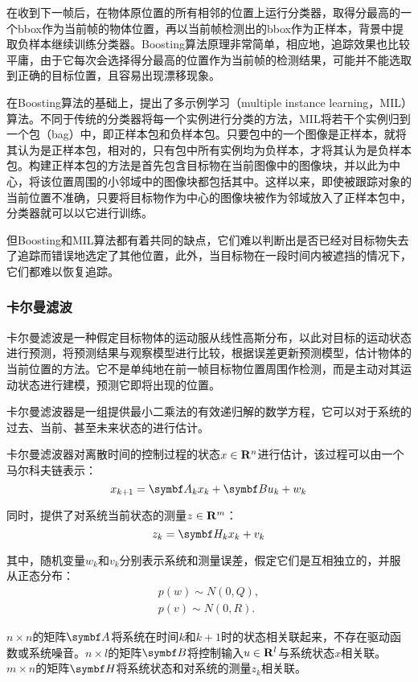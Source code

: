   在收到下一帧后，在物体原位置的所有相邻的位置上运行分类器，取得分最高的一个bbox作为当前帧的物体位置，再以当前帧检测出的bbox作为正样本，背景中提取负样本继续训练分类器。Boosting算法原理非常简单，相应地，追踪效果也比较平庸，由于它每次会选择得分最高的位置作为当前帧的检测结果，可能并不能选取到正确的目标位置，且容易出现漂移现象。

  在Boosting算法的基础上，\citet{babenko2009visual}提出了多示例学习（multiple instance learning，MIL）算法。不同于传统的分类器将每一个实例进行分类的方法，MIL将若干个实例归到一个包（bag）中，即正样本包和负样本包。只要包中的一个图像是正样本，就将其认为是正样本包，相对的，只有包中所有实例均为负样本，才将其认为是负样本包。构建正样本包的方法是首先包含目标物在当前图像中的图像块，并以此为中心，将该位置周围的小邻域中的图像块都包括其中。这样以来，即使被跟踪对象的当前位置不准确，只要将目标物作为中心的图像块被作为邻域放入了正样本包中，分类器就可以以它进行训练。

  但Boosting和MIL算法都有着共同的缺点，它们难以判断出是否已经对目标物失去了追踪而错误地选定了其他位置，此外，当目标物在一段时间内被遮挡的情况下，它们都难以恢复追踪。

\subsubsection{卡尔曼滤波}

  卡尔曼滤波是一种假定目标物体的运动服从线性高斯分布，以此对目标的运动状态进行预测，将预测结果与观察模型进行比较，根据误差更新预测模型，估计物体的当前位置的方法。它不是单纯地在前一帧目标物位置周围作检测，而是主动对其运动状态进行建模，预测它即将出现的位置。
  
  卡尔曼滤波器是一组提供最小二乘法的有效递归解的数学方程，它可以对于系统的过去、当前、甚至未来状态的进行估计\cite{welch1995introduction}。

  卡尔曼滤波器对离散时间的控制过程的状态$x\in \mathbf{R}^n$进行估计，该过程可以由一个马尔科夫链表示：
$$x_{k+1}=\mat{A}_k x_k + \mat{B} u_k + w_k$$

  同时，提供了对系统当前状态的测量$z\in \mathbf{R}^m$：
$$z_k=\mat{H}_k x_k + v_k$$

  其中，随机变量$w_k$和$v_k$分别表示系统和测量误差，假定它们是互相独立的，并服从正态分布：
\begin{gather*}
p(w)\sim N(0,Q),\\
p(v)\sim N(0,R).
\end{gather*}
  
  $n\times n$的矩阵$\mat{A}$将系统在时间$k$和$k+1$时的状态相关联起来，不存在驱动函数或系统噪音。$n\times l$的矩阵$\mat{B}$将控制输入$u\in \mathbf{R}^l$与系统状态$x$相关联。$m\times n$的矩阵$\mat{H}$将系统状态和对系统的测量$z_k$相关联。

